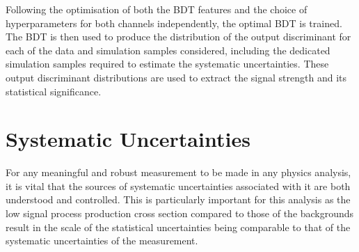 \begin{table}[htbp]
\label{tab:hyperparameters}
  \centering
\end{table}

Following the optimisation of both the BDT features and the choice of hyperparameters for both channels independently, the optimal BDT is trained.
The BDT is then used to produce the distribution of the output discriminant for each of the data and simulation samples considered, including the dedicated simulation samples required to estimate the systematic uncertainties.
These output discriminant distributions are used to extract the signal strength and its statistical significance.


\section{Systematic Uncertainties}\label{sec:systematics}
For any meaningful and robust measurement to be made in any physics analysis, it is vital that the sources of systematic uncertainties associated with it are both understood and controlled.
This is particularly important for this analysis as the low signal process production cross section compared to those of the backgrounds result in the scale of the statistical uncertainties being comparable to that of the systematic uncertainties of the measurement.

